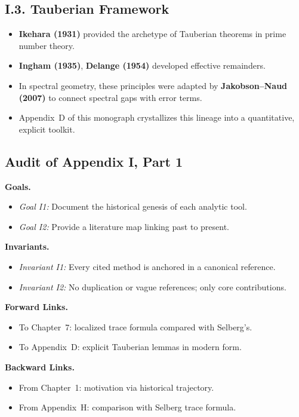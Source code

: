 \subsection*{I.3. Tauberian Framework}  
\begin{itemize}
  \item \textbf{Ikehara (1931)} provided the archetype of Tauberian theorems in prime number theory.  
  \item \textbf{Ingham (1935)}, \textbf{Delange (1954)} developed effective remainders.  
  \item In spectral geometry, these principles were adapted by \textbf{Jakobson–Naud (2007)} to connect spectral gaps with error terms.  
  \item Appendix~D of this monograph crystallizes this lineage into a quantitative, explicit toolkit.  
\end{itemize}

\subsection*{Audit of Appendix I, Part 1}  
\noindent\textbf{Goals.}  
\begin{itemize}
  \item \emph{Goal I1:} Document the historical genesis of each analytic tool.  
  \item \emph{Goal I2:} Provide a literature map linking past to present.  
\end{itemize}

\noindent\textbf{Invariants.}  
\begin{itemize}
  \item \emph{Invariant I1:} Every cited method is anchored in a canonical reference.  
  \item \emph{Invariant I2:} No duplication or vague references; only core contributions.  
\end{itemize}

\noindent\textbf{Forward Links.}  
\begin{itemize}
  \item To Chapter~7: localized trace formula compared with Selberg’s.  
  \item To Appendix~D: explicit Tauberian lemmas in modern form.  
\end{itemize}

\noindent\textbf{Backward Links.}  
\begin{itemize}
  \item From Chapter~1: motivation via historical trajectory.  
  \item From Appendix~H: comparison with Selberg trace formula.  
\end{itemize}

